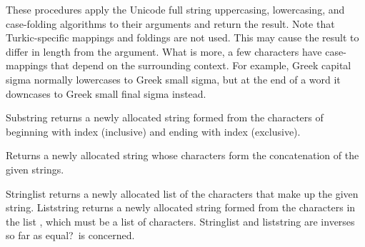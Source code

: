 \begin{entry}{%
}


These procedures apply the Unicode full string uppercasing, lowercasing,
and case-folding algorithms to their arguments and return the result.
Note that Turkic-specific mappings and foldings are not used.  This may
cause the result to differ in length from the argument.  What is more, a
few characters have case-mappings that depend on the surrounding context.
For example, Greek capital sigma normally lowercases to Greek small sigma,
but at the end of a word it downcases to Greek small final sigma instead.

\end{entry}


\begin{entry}{%
}

{\cf Substring} returns a newly allocated string formed from the characters of
 beginning with index  (inclusive) and ending with index
 (exclusive).
\end{entry}


\begin{entry}{%
}

Returns a newly allocated string whose characters form the concatenation of the
given strings.

\end{entry}


\begin{entry}{%
}

{\cf String\coerce{}list} returns a newly allocated list of the
characters that make up the given string.  {\cf List\coerce{}string}
returns a newly allocated string formed from the characters in the list
, which must be a list of characters. {\cf String\coerce{}list}
and {\cf list\coerce{}string} are
inverses so far as {\cf equal?}\ is concerned.  

\end{entry}


